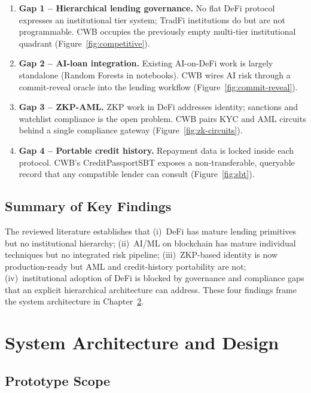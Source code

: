 \documentclass[12pt,a4paper]{report}
\begin{document}
\begin{enumerate}[leftmargin=*,itemsep=2pt]
    \item \textbf{Gap 1 -- Hierarchical lending governance.} No flat DeFi protocol expresses an institutional tier system; TradFi institutions do but are not programmable. CWB occupies the previously empty multi-tier institutional quadrant (Figure~\ref{fig:competitive}).
    \item \textbf{Gap 2 -- AI-loan integration.} Existing AI-on-DeFi work is largely standalone (Random Forests in notebooks). CWB wires AI risk through a commit-reveal oracle into the lending workflow (Figure~\ref{fig:commit-reveal}).
    \item \textbf{Gap 3 -- ZKP-AML.} ZKP work in DeFi addresses identity; sanctions and watchlist compliance is the open problem. CWB pairs KYC and AML circuits behind a single compliance gateway (Figure~\ref{fig:zk-circuits}).
    \item \textbf{Gap 4 -- Portable credit history.} Repayment data is locked inside each protocol. CWB's CreditPassportSBT exposes a non-transferable, queryable record that any compatible lender can consult (Figure~\ref{fig:sbt}).
\end{enumerate}

\section{Summary of Key Findings}
\label{sec:lit-summary-find}

The reviewed literature establishes that (i)~DeFi has mature lending primitives but no institutional hierarchy; (ii)~AI/ML on blockchain has mature individual techniques but no integrated risk pipeline; (iii)~ZKP-based identity is now production-ready but AML and credit-history portability are not; (iv)~institutional adoption of DeFi is blocked by governance and compliance gaps that an explicit hierarchical architecture can address. These four findings frame the system architecture in Chapter~\ref{ch:arch}.

\chapter{System Architecture and Design}
\label{ch:arch}

\section{Prototype Scope}
\label{sec:proto-scope}
\end{document}
